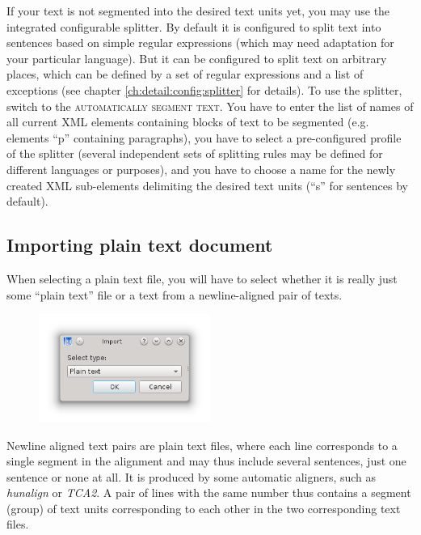 \documentclass[a4paper,10pt,oneside]{book}
\newcommand{\menu}[1]{\textsc{#1}}
\begin{document}
If your text is not segmented into the desired text units yet, you may use the integrated configurable splitter. By default it is configured to split text into sentences based on simple regular expressions (which may need adaptation for your particular language). But it can be configured to split text on arbitrary places, which can be defined by a set of regular expressions and a list of exceptions (see chapter \ref{ch:detail:config:splitter} for details). To use the splitter, switch to the \menu{automatically segment text}. You have to enter the list of names of all current XML elements containing blocks of text to be segmented (e.g. elements ``p'' containing paragraphs), you have to select a pre-configured profile of the splitter (several independent sets of splitting rules may be defined for different languages or purposes), and you have to choose a name for the newly created XML sub-elements delimiting the desired text units (``s'' for sentences by default).

\subsection{Importing plain text document}\label{ch:detail:managing_local:new:txt}

When selecting a plain text file, you will have to select whether it is really just some ``plain text'' file or a text from a newline-aligned pair of texts.

\begin{figure}[htb]
 \includegraphics[width=0.5\textwidth]{screenshots/text_import_type.png}
\end{figure}

Newline aligned text pairs are plain text files, where each line corresponds to a single segment in the alignment and may thus include several sentences, just one sentence or none at all. It is produced by some automatic aligners, such as \emph{hunalign} or \emph{TCA2}. A pair of lines with the same number thus contains a segment (group) of text units corresponding to each other in the two corresponding text files.
\end{document}
